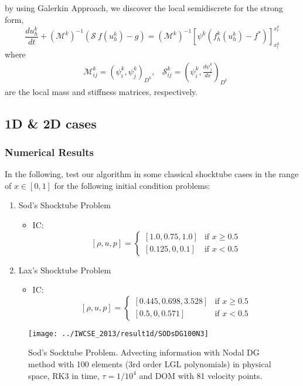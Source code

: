 \begin{frame}
	by using Galerkin Approach, we discover the local semidiscrete for the strong form,
	\begin{equation}
		\frac{du_h^k}{dt} + (\mathcal{M}^k)^{-1} (\mathcal{S} \ f(u_h^k) - g ) = 
		(\mathcal{M}^k)^{-1} \left[\psi^k(f_h^k(u_h^k) - f^{*})\right]_{x_l^k}^{x_r^k}
	\end{equation}
	where
	\begin{align}
		&\mathcal{M}_{ij}^{k} = (\psi_i^k,\psi_j^k)_{D^k}, 
		&\mathcal{S}_{ij}^{k} = \left( \psi_i^k,\frac{d\psi_j^k}{dx} \right)_{D^k}
	\end{align}
	are the local mass and stiffness matrices, respectively.
\end{frame}

\subsection{1D \& 2D cases}
\begin{frame} \frametitle{Numerical Results}
	In the following, test our algorithm in some classical shocktube cases in the range of $x \in [0,1]$ for the following initial condition problems:
	\begin{enumerate}
	\item Sod's Shocktube Problem
		\begin{itemize}
		\item IC: 
		\[
		[\rho,u,p] =
		\begin{cases}
		[1.0,0.75,1.0] & \text{if } x \geq 0.5 \\
		[0.125,0,0.1] & \text{if } x < 0.5
		\end{cases}
		\]
		\end{itemize}
	\item Lax's Shocktube Problem
	\begin{itemize}
		\item IC: 
		\[
		[\rho,u,p] =
		\begin{cases}
		[0.445,0.698,3.528] & \text{if } x \geq 0.5 \\
		[0.5,0,0.571] & \text{if } x < 0.5
		\end{cases}
		\]
		\end{itemize}
	\end{enumerate}
\end{frame}

\begin{frame}
		\begin{figure}
			\centering
				\texttt{[image: ../IWCSE\_2013/result1d/SODsDG100N3]}
			\caption{Sod's  Socktube Problem. Advecting information with Nodal DG method with 100 elements (3rd order LGL polynomials) in physical space, RK3 in time, $\tau = 1/10^4$ and DOM with 81 velocity points.}
			\label{fig:SODsDG100N3}
		\end{figure}
\end{frame}

